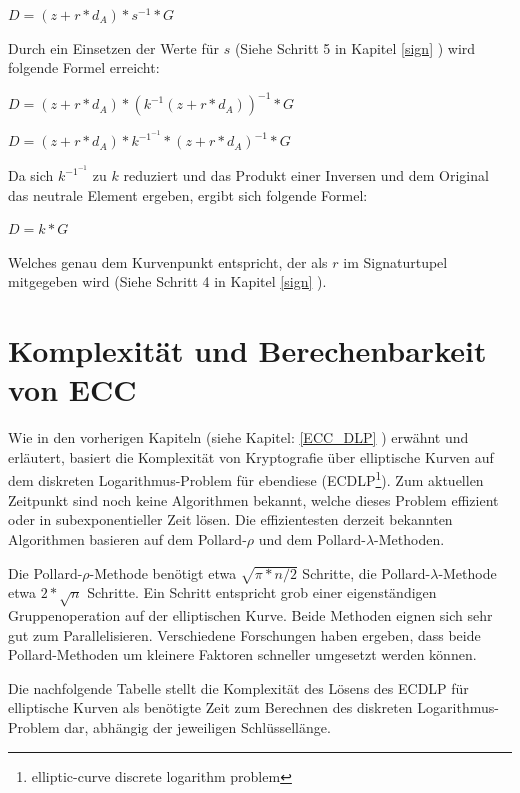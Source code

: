 $D = (z + r*d_A) * s^{-1} * G$

Durch ein Einsetzen der Werte für $s$ (Siehe Schritt 5 in Kapitel \ref{sign} ) wird folgende Formel erreicht:

$D = (z + r*d_A) * (k^{-1}(z+r*d_A))^{-1} * G$

$D = (z + r*d_A) * k^{-1^{-1}} * (z+r*d_A)^{-1} * G$

Da sich $k^{-1^{-1}}$ zu $k$ reduziert und das Produkt einer Inversen und dem Original das neutrale Element ergeben, 
ergibt sich folgende Formel:

$D = k * G$

Welches genau dem Kurvenpunkt entspricht, der als $r$ im Signaturtupel mitgegeben wird (Siehe Schritt 4 in Kapitel \ref{sign} ).

\section{Komplexität und Berechenbarkeit von ECC}

Wie in den vorherigen Kapiteln (siehe Kapitel: \ref{ECC_DLP} ) erwähnt und erläutert, basiert die Komplexität
von Kryptografie über elliptische Kurven auf dem diskreten Logarithmus-Problem für ebendiese 
(ECDLP\footnote{elliptic-curve discrete logarithm problem}).
Zum aktuellen Zeitpunkt sind noch keine Algorithmen bekannt, welche dieses Problem effizient oder in subexponentieller Zeit
lösen.
Die effizientesten derzeit bekannten Algorithmen basieren auf dem Pollard-$\rho$ und dem Pollard-$\lambda$-Methoden\cite{ecc_complexity}.

Die Pollard-$\rho$-Methode benötigt etwa $\sqrt{\pi * n / 2}$ Schritte, die Pollard-$\lambda$-Methode etwa $2*\sqrt{n}$ Schritte.
Ein Schritt entspricht grob einer eigenständigen Gruppenoperation auf der elliptischen Kurve. Beide Methoden eignen sich
sehr gut zum Parallelisieren. Verschiedene Forschungen haben ergeben, dass beide Pollard-Methoden um kleinere Faktoren
schneller umgesetzt werden können\cite{ecc_complexity}.

Die nachfolgende Tabelle stellt die Komplexität des Lösens des ECDLP für elliptische Kurven als benötigte Zeit zum Berechnen
des diskreten Logarithmus-Problem dar, abhängig der jeweiligen Schlüssellänge.

